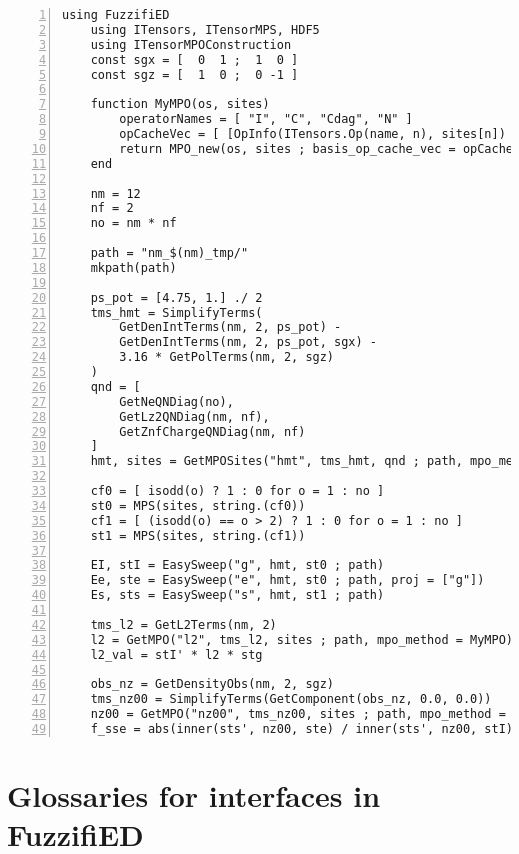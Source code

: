 \documentclass{timesjhep}
\begin{document}
\begin{lstlisting}[numbers=left]
    using FuzzifiED
    using ITensors, ITensorMPS, HDF5
    using ITensorMPOConstruction
    const sgx = [  0  1 ;  1  0 ]
    const sgz = [  1  0 ;  0 -1 ]

    function MyMPO(os, sites)
        operatorNames = [ "I", "C", "Cdag", "N" ]
        opCacheVec = [ [OpInfo(ITensors.Op(name, n), sites[n]) for name in operatorNames] for n in eachindex(sites)  ]
        return MPO_new(os, sites ; basis_op_cache_vec = opCacheVec)
    end

    nm = 12
    nf = 2
    no = nm * nf

    path = "nm_$(nm)_tmp/"
    mkpath(path)

    ps_pot = [4.75, 1.] ./ 2
    tms_hmt = SimplifyTerms(
        GetDenIntTerms(nm, 2, ps_pot) - 
        GetDenIntTerms(nm, 2, ps_pot, sgx) - 
        3.16 * GetPolTerms(nm, 2, sgz)
    )
    qnd = [ 
        GetNeQNDiag(no), 
        GetLz2QNDiag(nm, nf), 
        GetZnfChargeQNDiag(nm, nf) 
    ]
    hmt, sites = GetMPOSites("hmt", tms_hmt, qnd ; path, mpo_method = MyMPO)

    cf0 = [ isodd(o) ? 1 : 0 for o = 1 : no ]
    st0 = MPS(sites, string.(cf0))
    cf1 = [ (isodd(o) == o > 2) ? 1 : 0 for o = 1 : no ]
    st1 = MPS(sites, string.(cf1))

    EI, stI = EasySweep("g", hmt, st0 ; path)
    Ee, ste = EasySweep("e", hmt, st0 ; path, proj = ["g"])
    Es, sts = EasySweep("s", hmt, st1 ; path)

    tms_l2 = GetL2Terms(nm, 2)
    l2 = GetMPO("l2", tms_l2, sites ; path, mpo_method = MyMPO)
    l2_val = stI' * l2 * stg

    obs_nz = GetDensityObs(nm, 2, sgz)
    tms_nz00 = SimplifyTerms(GetComponent(obs_nz, 0.0, 0.0))
    nz00 = GetMPO("nz00", tms_nz00, sites ; path, mpo_method = MyMPO)
    f_sse = abs(inner(sts', nz00, ste) / inner(sts', nz00, stI))
\end{lstlisting}

\section{Glossaries for interfaces in FuzzifiED}
\end{document}
